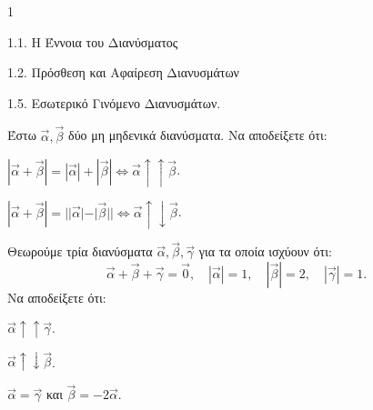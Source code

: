 \begin{ylh}{1}
    \item 1.1. Η Έννοια του Διανύσματος
    \item 1.2. Πρόσθεση και Αφαίρεση Διανυσμάτων
    \item 1.5. Εσωτερικό Γινόμενο Διανυσμάτων.
\end{ylh}
\begin{alist}
    \item Έστω $\vec{\alpha}, \vec{\beta}$ δύο μη μηδενικά διανύσματα. Να αποδείξετε ότι:
    \begin{rlist}
        \item $|\vec{\alpha} + \vec{\beta}| = |\vec{\alpha}| + |\vec{\beta}| \Leftrightarrow \vec{\alpha} \uparrow\uparrow \vec{\beta}$. 
        \item $|\vec{\alpha} + \vec{\beta}| = ||\vec{\alpha}| - |\vec{\beta}|| \Leftrightarrow \vec{\alpha} \uparrow\downarrow \vec{\beta}$. 
    \end{rlist}
    \item Θεωρούμε τρία διανύσματα $\vec{\alpha}, \vec{\beta}, \vec{\gamma}$ για τα οποία ισχύουν ότι:
    \[ \vec{\alpha} + \vec{\beta} + \vec{\gamma} = \vec{0}, \quad |\vec{\alpha}| = 1, \quad |\vec{\beta}| = 2, \quad |\vec{\gamma}| = 1. \]
    Να αποδείξετε ότι:
    \begin{rlist}
        \item $\vec{\alpha} \uparrow\uparrow \vec{\gamma}$. 
        \item $\vec{\alpha} \uparrow\downarrow \vec{\beta}$. 
        \item $\vec{\alpha} = \vec{\gamma}$ και $\vec{\beta} = -2\vec{\alpha}$. 
    \end{rlist}
\end{alist}